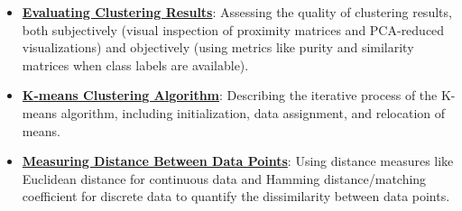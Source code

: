 \documentclass{article}%
\begin{document}
\begin{itemize}[leftmargin=*]
\item \href{https://purdue.brightspace.com/d2l/common/assets/pdfjs-d2l-dist/1.0.14-legacy/web/viewer.html?file=\%2Fcontent\%2Fenforced\%2F1095467-wl.202510.CS.24300.001\%2F12L2-distance-clusters.pdf\%3Fou\%3D1095467\&lang=en-us\&container=d2l-fileviewer-rendered-pdf\&fullscreen=d2l-fileviewer-rendered-pdf-dialog\&height=667#page=32}{\textbf{Evaluating Clustering Results}}: Assessing the quality of clustering results, both subjectively (visual inspection of proximity matrices and PCA-reduced visualizations) and objectively (using metrics like purity and similarity matrices when class labels are available).%
\item \href{https://purdue.brightspace.com/d2l/common/assets/pdfjs-d2l-dist/1.0.14-legacy/web/viewer.html?file=\%2Fcontent\%2Fenforced\%2F1095467-wl.202510.CS.24300.001\%2F12L2-distance-clusters.pdf\%3Fou\%3D1095467\&lang=en-us\&container=d2l-fileviewer-rendered-pdf\&fullscreen=d2l-fileviewer-rendered-pdf-dialog\&height=667#page=21}{\textbf{K{-}means Clustering Algorithm}}: Describing the iterative process of the K-means algorithm, including initialization, data assignment, and relocation of means.%
\item \href{https://purdue.brightspace.com/d2l/common/assets/pdfjs-d2l-dist/1.0.14-legacy/web/viewer.html?file=\%2Fcontent\%2Fenforced\%2F1095467-wl.202510.CS.24300.001\%2F12L2-distance-clusters.pdf\%3Fou\%3D1095467\&lang=en-us\&container=d2l-fileviewer-rendered-pdf\&fullscreen=d2l-fileviewer-rendered-pdf-dialog\&height=667#page=17}{\textbf{Measuring Distance Between Data Points}}: Using distance measures like Euclidean distance for continuous data and Hamming distance/matching coefficient for discrete data to quantify the dissimilarity between data points.%
\end{itemize}%
\end{document}
